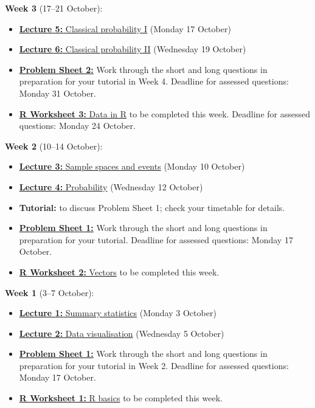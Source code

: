 \documentclass[
  a4paper,
]{book}
\providecommand{\tightlist}{%
  \setlength{\itemsep}{0pt}\setlength{\parskip}{0pt}}
\theoremstyle{definition}
\theoremstyle{definition}
\theoremstyle{definition}
\theoremstyle{definition}
\theoremstyle{remark}
\begin{document}
\textbf{Week 3} (17--21 October):

\begin{itemize}
\tightlist
\item
  \protect\hyperlink{L05-classical-i}{\textbf{Lecture 5:} Classical probability I} (Monday 17 October)
\item
  \protect\hyperlink{L05-classical-ii}{\textbf{Lecture 6:} Classical probability II} (Wednesday 19 October)
\item
  \protect\hyperlink{P2}{\textbf{Problem Sheet 2:}} Work through the short and long questions in preparation for your tutorial in Week 4. Deadline for assessed questions: Monday 31 October.
\item
  \protect\hyperlink{r-work}{\textbf{R Worksheet 3:} Data in R} to be completed this week. Deadline for assessed questions: Monday 24 October.
\end{itemize}

\textbf{Week 2} (10--14 October):

\begin{itemize}
\tightlist
\item
  \protect\hyperlink{L03-events}{\textbf{Lecture 3:} Sample spaces and events} (Monday 10 October)
\item
  \protect\hyperlink{L04-probability}{\textbf{Lecture 4:} Probability} (Wednesday 12 October)
\item
  \textbf{Tutorial:} to discuss Problem Sheet 1; check your timetable for details.
\item
  \protect\hyperlink{P1}{\textbf{Problem Sheet 1:}} Work through the short and long questions in preparation for your tutorial. Deadline for assessed questions: Monday 17 October.
\item
  \protect\hyperlink{r-work}{\textbf{R Worksheet 2:} Vectors} to be completed this week.
\end{itemize}

\textbf{Week 1} (3--7 October):

\begin{itemize}
\tightlist
\item
  \protect\hyperlink{L01-stats}{\textbf{Lecture 1:} Summary statistics} (Monday 3 October)
\item
  \protect\hyperlink{L02-dataviz}{\textbf{Lecture 2:} Data visualisation} (Wednesday 5 October)
\item
  \protect\hyperlink{P1}{\textbf{Problem Sheet 1:}} Work through the short and long questions in preparation for your tutorial in Week 2. Deadline for assessed questions: Monday 17 October.
\item
  \protect\hyperlink{r-work}{\textbf{R Worksheet 1:} R basics} to be completed this week.
\end{itemize}
\end{document}
